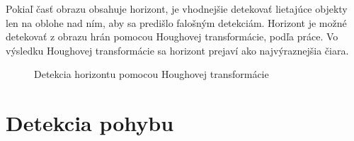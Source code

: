         Pokiaľ časť obrazu obsahuje horizont, je vhodnejšie detekovať lietajúce objekty len na oblohe nad ním, aby sa predišlo falošným detekciám. Horizont je možné detekovať z obrazu hrán pomocou Houghovej transformácie, podľa práce. Vo výsledku Houghovej transformácie sa horizont prejaví ako najvýraznejšia čiara.


        \begin{figure}[H]
            \centering
            \caption{Detekcia horizontu pomocou Houghovej transformácie}
        \end{figure}

\section{Detekcia pohybu}

